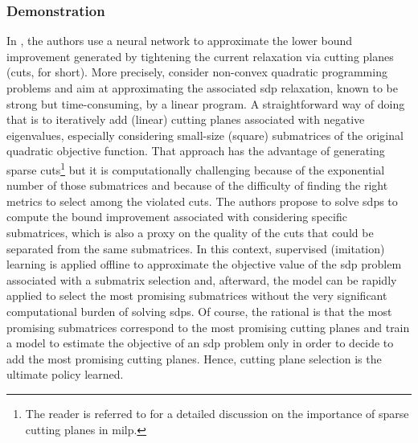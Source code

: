 \documentclass[11pt]{article}
\begin{document}
		\subsubsection{Demonstration}
		\label{sec:demonstration}
		In  \cite{Baltean-LugojanStrongsparsecut2018}, the authors use a neural network to approximate the
		lower bound improvement generated by tightening the current relaxation via cutting planes (cuts,
		for short).
		More precisely, \cite{Baltean-LugojanStrongsparsecut2018} consider non-convex quadratic programming
		problems and aim at approximating the associated \gls{sdp} relaxation, known to be strong but
		time-consuming, by a linear program.
		A straightforward way of doing that is to iteratively add (linear) cutting planes associated with
		negative eigenvalues, especially considering small-size (square) submatrices of the original
		quadratic objective function.
		That approach has the advantage of generating sparse cuts\footnote{
		    The reader is referred to \cite{DeyMolinaro2018} for a detailed discussion on the importance of
		    sparse cutting planes in \gls{milp}.
		} but it is computationally challenging because of the exponential number of those
		submatrices and because of the difficulty of finding the right metrics to select among the violated
		cuts.
		The authors propose to solve \glspl{sdp} to compute the bound improvement associated with
		considering specific submatrices, which is also a proxy on the quality of the cuts that could be
		separated from the same submatrices.
		In this context, supervised (imitation) learning is applied offline to approximate the objective
		value of the \gls{sdp} problem associated with a submatrix selection and, afterward, the model can
		be rapidly applied to select the most promising submatrices without the very significant
		computational burden of solving \glspl{sdp}.
		Of course, the rational is that the most promising submatrices correspond to the most promising
		cutting planes and \cite{Baltean-LugojanStrongsparsecut2018} train a model to estimate the
		objective of an \gls{sdp} problem only in order to decide to add the most promising cutting planes.
		Hence, cutting plane selection is the ultimate policy learned.
\end{document}
